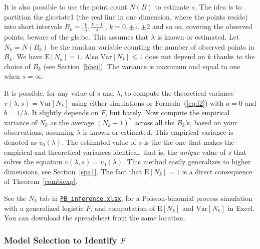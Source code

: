 \documentclass[10pt]{article}
\begin{document}

\noindent It is also possible to use the point count $N(B)$ to estimate $s$. The idea is to partition the \gls{gls:state1}
(the real line in one dimension, where the points reside)  into short intervals $B_k=\Big[\frac{k}{\lambda},\frac{k+1}{\lambda}\Big[$, $k=0,\pm 1, \pm 2$ and so on, covering the observed points; beware of the \gls{gls:be}. This assumes that $\lambda$ is known or estimated. Let $N_k=N(B_k)$ be the random variable counting the number of observed points in $B_k$. We have $\mbox{E}[N_k]=1$. Also $\mbox{Var}[N_k]\leq 1$ does not depend on $k$ thanks to the
choice of $B_k$ (see Section~\ref{bbei}). The variance is maximum and equal to one when $s=\infty$.

It is possible, for any value of $s$ and $\lambda$, to compute the theoretical variance $v(\lambda,s)=\mbox{Var}[N_k]$ using either simulations
or Formula~(\ref{eq:f2}) with $a=0$ and $b=1/\lambda$. It slightly depends on $F$, but
barely. Now compute the empirical variance of $N_k$ as the average $(N_k-1)^2$ across all the $B_k$'s, based on your observations, assuming $\lambda$ is known or estimated.  This empirical variance is denoted as $v_0(\lambda)$. The estimated value of $s$ is the the one that makes the empirical and theoretical variances identical, that is, the {\em unique} value of $s$ that solves the equation $v(\lambda,s)=v_0(\lambda)$. This method easily generalizes to higher dimensions, see Section~\ref{spa1}. The fact that $\mbox{E}[N_k]=1$
 is a direct consequence of Theorem~\ref{combiexp}.

See the $N_k$ tab in \href{https://github.com/VincentGranville/Point-Processes/tree/main/Spreadsheets}{\texttt{PB\_inference.xlsx}}, for a Poisson-binomial process simulation with a \textcolor{index}{generalized logistic} $F$, and computation of $\mbox{E}[N_k]$ and $\mbox{Var}[N_k]$ in Excel. You can download the spreadsheet from the same location.



\subsubsection{Model Selection to Identify $F$}\label{bore}
\end{document}
